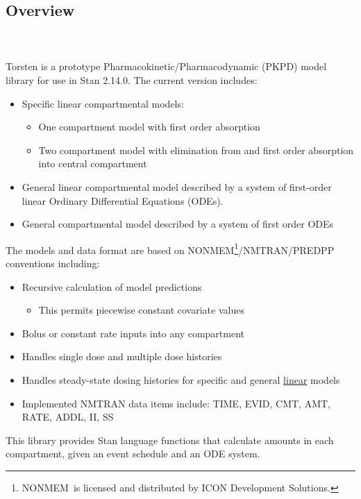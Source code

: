 \documentclass[11pt]{amsart}
\begin{document}
\subsection{Overview} \ \\ \ \\
Torsten is a prototype Pharmacokinetic/Pharmacodynamic (PKPD) model library for use in Stan 2.14.0. The current version includes:
\begin{itemize}
  \item Specific linear compartmental models:
  \begin{itemize}
    \item One compartment model with first order absorption
    \item Two compartment model with elimination from and first order absorption into central compartment
  \end{itemize}
  \item General linear compartmental model described by a system of first-order linear Ordinary Differential Equations (ODEs).
  \item General compartmental model described by a system of first order ODEs 
 \end{itemize}

The models and data format are based on NONMEM\textregistered\footnote{NONMEM\textregistered\ is licensed and distributed by ICON Development Solutions.}/NMTRAN/PREDPP conventions including:
\begin{itemize}
  \item Recursive calculation of model predictions
  \begin{itemize}
    \item This permits piecewise constant covariate values
  \end{itemize}
  \item Bolus or constant rate inputs into any compartment
  \item Handles single dose and multiple dose histories
  \item Handles steady-state dosing histories for specific and general \underline{linear} models
  \item Implemented NMTRAN data items include: TIME, EVID, CMT, AMT, RATE, ADDL, II, SS
\end{itemize}

This library provides Stan language functions that calculate amounts in each compartment, given an event schedule and an ODE system.
    
\end{document}
